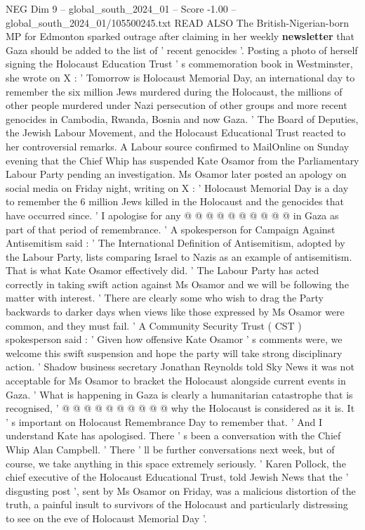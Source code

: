\begin{textsample}{NEG Dim 9 – global\_south\_2024\_01 – Score -1.00 – global\_south\_2024\_01/105500245.txt}  \label{ex:f9_neg_389}
READ ALSO The British-Nigerian-born MP for Edmonton sparked outrage after claiming in her weekly \textbf{newsletter} that Gaza should be added to the list of ' recent genocides '.
Posting a photo of herself signing the Holocaust Education Trust ' s commemoration book in Westminster, she wrote on X : ' Tomorrow is Holocaust Memorial Day, an international day to remember the six million Jews murdered during the Holocaust, the millions of other people murdered under Nazi persecution of other groups and more recent genocides in Cambodia, Rwanda, Bosnia and now Gaza. ' The Board of Deputies, the Jewish Labour Movement, and the Holocaust Educational Trust reacted to her controversial remarks.
A Labour source confirmed to MailOnline on Sunday evening that the Chief Whip has suspended Kate Osamor from the Parliamentary Labour Party pending an investigation.
Ms Osamor later posted an apology on social media on Friday night, writing on X : ' Holocaust Memorial Day is a day to remember the 6 million Jews killed in the Holocaust and the genocides that have occurred since. ' I apologise for any @ @ @ @ @ @ @ @ @ @ in Gaza as part of that period of remembrance. ' A spokesperson for Campaign Against Antisemitism said : ' The International Definition of Antisemitism, adopted by the Labour Party, lists comparing Israel to Nazis as an example of antisemitism.
That is what Kate Osamor effectively did. ' The Labour Party has acted correctly in taking swift action against Ms Osamor and we will be following the matter with interest. ' There are clearly some who wish to drag the Party backwards to darker days when views like those expressed by Ms Osamor were common, and they must fail. ' A Community Security Trust ( CST ) spokesperson said : ' Given how offensive Kate Osamor ' s comments were, we welcome this swift suspension and hope the party will take strong disciplinary action. ' Shadow business secretary Jonathan Reynolds told Sky News it was not acceptable for Ms Osamor to bracket the Holocaust alongside current events in Gaza. ' What is happening in Gaza is clearly a humanitarian catastrophe that is recognised, ' @ @ @ @ @ @ @ @ @ @ why the Holocaust is considered as it is.
It ' s important on Holocaust Remembrance Day to remember that. ' And I understand Kate has apologised.
There ' s been a conversation with the Chief Whip Alan Campbell. ' There ' ll be further conversations next week, but of course, we take anything in this space extremely seriously. ' Karen Pollock, the chief executive of the Holocaust Educational Trust, told Jewish News that the ' disgusting post ', sent by Ms Osamor on Friday, was a malicious distortion of the truth, a painful insult to survivors of the Holocaust and particularly distressing to see on the eve of Holocaust Memorial Day '.

\end{textsample}
